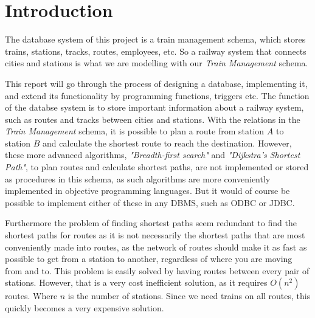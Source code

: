 \section{Introduction}

The database system of this project is a train management schema, which stores 
trains, stations, tracks, routes, employees, etc. So a railway system that 
connects cities and stations is what we are modelling with our \emph{Train 
Management} schema.

This report will go through the process of designing a database, implementing 
it, and extend its functionality by programming functions, triggers etc.
The function of the databse system is to store important information about a 
railway system, such as routes and tracks between cities and stations. With the 
relations in the \emph{Train Management} schema, it is possible to plan a route 
from station $A$ to station $B$ and calculate the shortest route to 
reach the destination. However, these more advanced algorithms, 
\textit{"Breadth-first search"} and \textit{"Dijkstra's Shortest Path"}, to 
plan routes and calculate shortest paths, are not implemented or stored as 
procedures in this schema, as such algorithms are more conveniently implemented 
in objective programming languages. But it would of course be possible to 
implement either of these in any DBMS, such as ODBC or JDBC.


Furthermore the problem of finding shortest paths seem redundant to find the 
shortest paths for routes as it is not necessarily the shortest paths that are 
most conveniently made into routes, as the network of routes should make it as 
fast as possible to get from a station to another, regardless of where you are 
moving from and to. This problem is easily solved by having routes between 
every pair of stations. However, that is a very cost inefficient solution, as 
it requires $O(n^2)$ routes. Where $n$ is the number of stations. Since we need 
trains on all routes, this quickly becomes a very expensive solution. 






